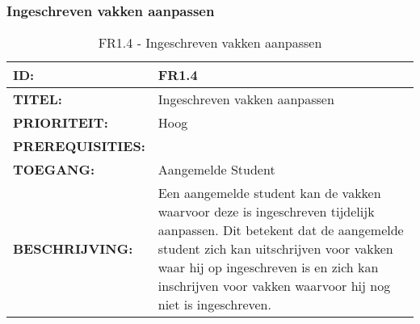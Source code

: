 \subsubsection{Ingeschreven vakken aanpassen}
\noindent\begin{table}[H]
            \begin{tabular}{l | p{10cm}}
                \textbf{ID:} & FR1.4\\ \hline
                \textbf{TITEL:} & Ingeschreven vakken aanpassen\\ \hline
                \textbf{PRIORITEIT:} &  Hoog \\ \hline
                \textbf{PREREQUISITIES:} & \\ \hline
                \textbf{TOEGANG:} &  Aangemelde Student \\ \hline
                \textbf{BESCHRIJVING:} & Een aangemelde student kan de vakken waarvoor deze is ingeschreven tijdelijk aanpassen. 
                						Dit betekent dat de aangemelde student zich kan uitschrijven voor vakken waar hij op ingeschreven is en  zich kan inschrijven voor vakken waarvoor hij nog niet is ingeschreven.\\
            \end{tabular}\\
            \caption{FR1.4 - Ingeschreven vakken aanpassen}
            \label{tab:FR1.4 - Ingeschreven vakken aanpassen}
        \end{table}
        
